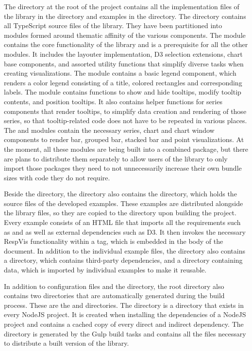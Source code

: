 The  directory at the root of the project contains all the implementation files of the library in the  directory and examples in the  directory.
The  directory contains all TypeScript source files of the library.
They have been partitioned into modules formed around thematic affinity of the various components.
The  module contains the core functionality of the library and is a prerequisite for all the other modules.
It includes the layouter implementation, D3 selection extensions, chart base components, and assorted utility functions that simplify diverse tasks when creating visualizations.
The  module contains a basic legend component, which renders a color legend consisting of a title, colored rectangles and corresponding labels.
The  module contains functions to show and hide tooltips, modify tooltip contents, and position tooltips.
It also contains helper functions for series components that render tooltips, to simplify data creation and rendering of those series, so that tooltip-related code does not have to be repeated in various places.
The  and  modules contain the necessary series, chart and chart window components to render bar, grouped bar, stacked bar and point visualizations. 
At the moment, all these modules are being built into a combined package, but there are plans to distribute them separately to allow users of the library to only import those packages they need to not unnecessarily increase their own bundle sizes with code they do not require.

Beside the  directory, the  directory also contains the  directory, which holds the source files of the developed examples.
These examples are distributed alongside the library files, so they are copied to the  directory upon building the project.
Every example consists of an HTML file that imports all the requirements such as  and  as well as external dependencies such as D3.
It then invokes the necessary RespVis functionality within a  tag, which is embedded in the body of the document.
In addition to the individual example files, the  directory also contains a  directory, which contains third-party dependencies, and a  directory containing data, which is imported by individual examples to make it reusable.

In addition to configuration files and the  directory, the root directory also contains two directories that are automatically generated during the build process.
These are the  and  directories.
The  directory is a directory that exists in every NodeJS project.
It is created when installing the dependencies of a NodeJS project and contains a cached copy of every direct and indirect dependency.
The  directory is generated by the Gulp build tasks and contains all the files necessary to distribute a built version of the library.

